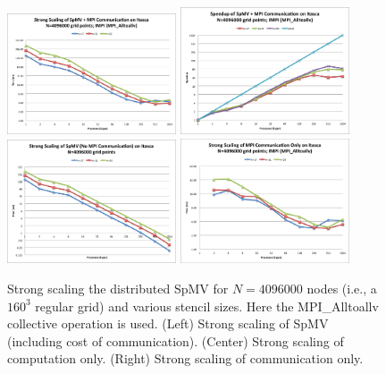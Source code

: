 \documentclass{report}
\begin{document}
\begin{figure} 
\centering
\includegraphics[width=5cm]{performance_content/scaling/strong_scaling_4M_regular_alltoallv.png}  
\includegraphics[width=5cm]{performance_content/scaling/strong_scaling_4M_regular_alltoallv_speedup.png} \\
\includegraphics[width=5cm]{performance_content/scaling/strong_scaling_4M_regular_spmvOnly.png}
\includegraphics[width=5cm]{performance_content/scaling/strong_scaling_4M_regular_alltoallv_commOnly.png} 
\caption{Strong scaling the distributed SpMV for $N=4096000$ nodes (i.e., a $160^3$ regular grid) and various stencil sizes. Here the MPI\_Alltoallv collective operation is used. (Left) Strong scaling of SpMV (including cost of communication). (Center) Strong scaling of computation only. (Right) Strong scaling of communication only.}
\end{figure}
\end{document}
